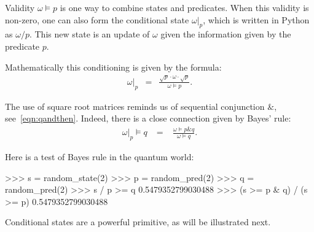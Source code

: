 \documentclass[leqno]{tufte-book} %
\newcommand{\Python}{\textrm{Python}\xspace}
\newcommand{\andthen}{\mathrel{\&}}
\begin{document}
Validity $\omega\models p$ is one way to combine states and
predicates. When this validity is non-zero, one can also form the
conditional state $\omega|_{p}$,
which is written in \Python as $\omega/p$. This new state is an update
of $\omega$ given the information given by the predicate $p$.

Mathematically this conditioning is given by the formula:
\begin{equation}
\label{eqn:qconditiong}
\begin{array}{rcl}
\omega|_{p}
& = &
\displaystyle\frac{\sqrt{p} \cdot \omega \cdot \sqrt{p}}{\omega\models p}.
\end{array}
\end{equation}

\noindent The use of square root matrices reminds us of sequential
conjunction $\andthen$, see~\eqref{eqn:qandthen}. Indeed, there is a
close connection given by Bayes' rule:
\begin{equation}
\label{eqn:qbayes}
\begin{array}{rcl}
\omega|_{p} \models q
& \;=\; &
\displaystyle\frac{\omega\models p\andthen q}{\omega\models q}.
\end{array}
\end{equation}

\noindent Here is a test of Bayes rule in the quantum world:
\begin{python}
>>> s = random_state(2)
>>> p = random_pred(2)
>>> q = random_pred(2)
>>> s / p >= q
0.5479352799030488
>>> (s >= p & q) / (s >= p)
0.5479352799030488
\end{python}

\noindent Conditional states are a powerful primitive, as will
be illustrated next.
\end{document}
